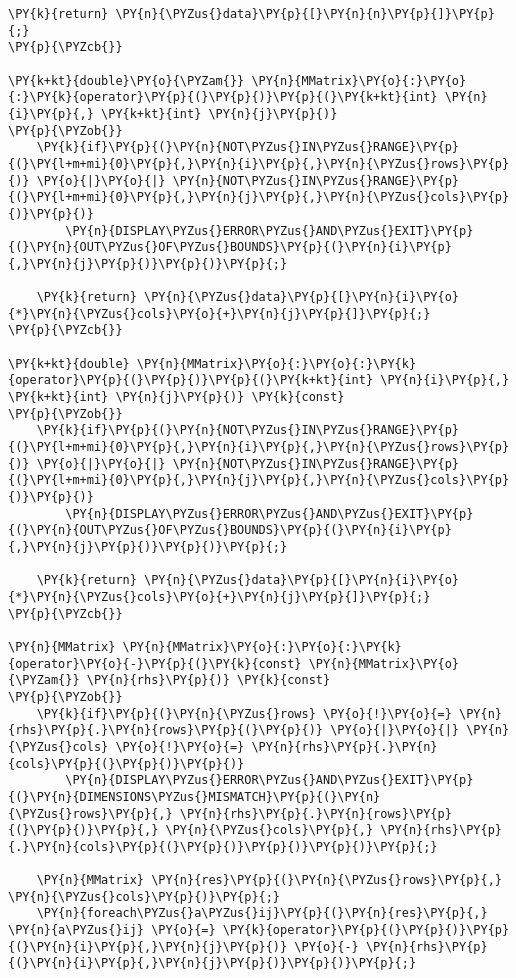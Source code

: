 \begin{Verbatim}[commandchars=\\\{\}]
	\PY{k}{return} \PY{n}{\PYZus{}data}\PY{p}{[}\PY{n}{n}\PY{p}{]}\PY{p}{;}
\PY{p}{\PYZcb{}}

\PY{k+kt}{double}\PY{o}{\PYZam{}} \PY{n}{MMatrix}\PY{o}{:}\PY{o}{:}\PY{k}{operator}\PY{p}{(}\PY{p}{)}\PY{p}{(}\PY{k+kt}{int} \PY{n}{i}\PY{p}{,} \PY{k+kt}{int} \PY{n}{j}\PY{p}{)}
\PY{p}{\PYZob{}}
	\PY{k}{if}\PY{p}{(}\PY{n}{NOT\PYZus{}IN\PYZus{}RANGE}\PY{p}{(}\PY{l+m+mi}{0}\PY{p}{,}\PY{n}{i}\PY{p}{,}\PY{n}{\PYZus{}rows}\PY{p}{)} \PY{o}{|}\PY{o}{|} \PY{n}{NOT\PYZus{}IN\PYZus{}RANGE}\PY{p}{(}\PY{l+m+mi}{0}\PY{p}{,}\PY{n}{j}\PY{p}{,}\PY{n}{\PYZus{}cols}\PY{p}{)}\PY{p}{)}
		\PY{n}{DISPLAY\PYZus{}ERROR\PYZus{}AND\PYZus{}EXIT}\PY{p}{(}\PY{n}{OUT\PYZus{}OF\PYZus{}BOUNDS}\PY{p}{(}\PY{n}{i}\PY{p}{,}\PY{n}{j}\PY{p}{)}\PY{p}{)}\PY{p}{;}

	\PY{k}{return} \PY{n}{\PYZus{}data}\PY{p}{[}\PY{n}{i}\PY{o}{*}\PY{n}{\PYZus{}cols}\PY{o}{+}\PY{n}{j}\PY{p}{]}\PY{p}{;}
\PY{p}{\PYZcb{}}

\PY{k+kt}{double} \PY{n}{MMatrix}\PY{o}{:}\PY{o}{:}\PY{k}{operator}\PY{p}{(}\PY{p}{)}\PY{p}{(}\PY{k+kt}{int} \PY{n}{i}\PY{p}{,} \PY{k+kt}{int} \PY{n}{j}\PY{p}{)} \PY{k}{const}
\PY{p}{\PYZob{}}
	\PY{k}{if}\PY{p}{(}\PY{n}{NOT\PYZus{}IN\PYZus{}RANGE}\PY{p}{(}\PY{l+m+mi}{0}\PY{p}{,}\PY{n}{i}\PY{p}{,}\PY{n}{\PYZus{}rows}\PY{p}{)} \PY{o}{|}\PY{o}{|} \PY{n}{NOT\PYZus{}IN\PYZus{}RANGE}\PY{p}{(}\PY{l+m+mi}{0}\PY{p}{,}\PY{n}{j}\PY{p}{,}\PY{n}{\PYZus{}cols}\PY{p}{)}\PY{p}{)}
		\PY{n}{DISPLAY\PYZus{}ERROR\PYZus{}AND\PYZus{}EXIT}\PY{p}{(}\PY{n}{OUT\PYZus{}OF\PYZus{}BOUNDS}\PY{p}{(}\PY{n}{i}\PY{p}{,}\PY{n}{j}\PY{p}{)}\PY{p}{)}\PY{p}{;}
	
	\PY{k}{return} \PY{n}{\PYZus{}data}\PY{p}{[}\PY{n}{i}\PY{o}{*}\PY{n}{\PYZus{}cols}\PY{o}{+}\PY{n}{j}\PY{p}{]}\PY{p}{;}
\PY{p}{\PYZcb{}}

\PY{n}{MMatrix} \PY{n}{MMatrix}\PY{o}{:}\PY{o}{:}\PY{k}{operator}\PY{o}{-}\PY{p}{(}\PY{k}{const} \PY{n}{MMatrix}\PY{o}{\PYZam{}} \PY{n}{rhs}\PY{p}{)} \PY{k}{const}
\PY{p}{\PYZob{}}
	\PY{k}{if}\PY{p}{(}\PY{n}{\PYZus{}rows} \PY{o}{!}\PY{o}{=} \PY{n}{rhs}\PY{p}{.}\PY{n}{rows}\PY{p}{(}\PY{p}{)} \PY{o}{|}\PY{o}{|} \PY{n}{\PYZus{}cols} \PY{o}{!}\PY{o}{=} \PY{n}{rhs}\PY{p}{.}\PY{n}{cols}\PY{p}{(}\PY{p}{)}\PY{p}{)}
		\PY{n}{DISPLAY\PYZus{}ERROR\PYZus{}AND\PYZus{}EXIT}\PY{p}{(}\PY{n}{DIMENSIONS\PYZus{}MISMATCH}\PY{p}{(}\PY{n}{\PYZus{}rows}\PY{p}{,} \PY{n}{rhs}\PY{p}{.}\PY{n}{rows}\PY{p}{(}\PY{p}{)}\PY{p}{,} \PY{n}{\PYZus{}cols}\PY{p}{,} \PY{n}{rhs}\PY{p}{.}\PY{n}{cols}\PY{p}{(}\PY{p}{)}\PY{p}{)}\PY{p}{)}\PY{p}{;}

	\PY{n}{MMatrix} \PY{n}{res}\PY{p}{(}\PY{n}{\PYZus{}rows}\PY{p}{,} \PY{n}{\PYZus{}cols}\PY{p}{)}\PY{p}{;}
	\PY{n}{foreach\PYZus{}a\PYZus{}ij}\PY{p}{(}\PY{n}{res}\PY{p}{,} \PY{n}{a\PYZus{}ij} \PY{o}{=} \PY{k}{operator}\PY{p}{(}\PY{p}{)}\PY{p}{(}\PY{n}{i}\PY{p}{,}\PY{n}{j}\PY{p}{)} \PY{o}{-} \PY{n}{rhs}\PY{p}{(}\PY{n}{i}\PY{p}{,}\PY{n}{j}\PY{p}{)}\PY{p}{)}\PY{p}{;}


\end{Verbatim}
